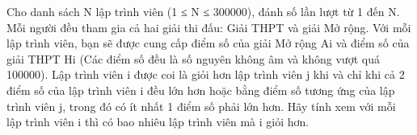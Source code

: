 Cho danh sách N lập trình viên (1 ≤ N ≤ 300000), đánh số lần lượt từ 1 đến N. Mỗi người đều tham gia cả hai giải thi đấu: Giải THPT và giải Mở rộng. Với mỗi lập trình viên, bạn sẽ được cung cấp điểm số của giải Mở rộng Ai và điểm số của giải THPT Hi (Các điểm số đều là số nguyên không âm và không vượt quá 100000). Lập trình viên i được coi là giỏi hơn lập trình viên j khi và chỉ khi cả 2 điểm số của lập trình viên i đều lớn hơn hoặc bằng điểm số tương ứng của lập trình viên j, trong đó có ít nhất 1 điểm số phải lớn hơn. Hãy tính xem với mỗi lập trình viên i thì có bao nhiêu lập trình viên mà i giỏi hơn.  

\